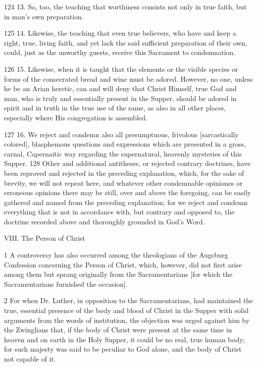 124 13. So, too, the teaching that worthiness consists not only in true faith, but in man’s own preparation.

125 14. Likewise, the teaching that even true believers, who have and keep a right, true, living faith, and yet lack the said sufficient preparation of their own, could, just as the unworthy guests, receive this Sacrament to condemnation.

126 15. Likewise, when it is taught that the elements or the visible species or forms of the consecrated bread and wine must be adored. However, no one, unless he be an Arian heretic, can and will deny that Christ Himself, true God and man, who is truly and essentially present in the Supper, should be adored in spirit and in truth in the true use of the same, as also in all other places, especially where His congregation is assembled.

127 16. We reject and condemn also all presumptuous, frivolous [sarcastically colored], blasphemous questions and expressions which are presented in a gross, carnal, Capernaitic way regarding the supernatural, heavenly mysteries of this Supper.
128 Other and additional antitheses, or rejected contrary doctrines, have been reproved and rejected in the preceding explanation, which, for the sake of brevity, we will not repeat here, and whatever other condemnable opiniones or erroneous opinions there may be still, over and above the foregoing, can be easily gathered and named from the preceding explanation; for we reject and condemn everything that is not in accordance with, but contrary and opposed to, the doctrine recorded above and thoroughly grounded in God’s Word.

VIII. The Person of Christ

1 A controversy has also occurred among the theologians of the Augsburg Confession concerning the Person of Christ, which, however, did not first arise among them but sprang originally from the Sacramentarians [for which the Sacramentarians furnished the occasion].

2 For when Dr. Luther, in opposition to the Sacramentarians, had maintained the true, essential presence of the body and blood of Christ in the Supper with solid arguments from the words of institution, the objection was urged against him by the Zwinglians that, if the body of Christ were present at the same time in heaven and on earth in the Holy Supper, it could be no real, true human body; for such majesty was said to be peculiar to God alone, and the body of Christ not capable of it.

